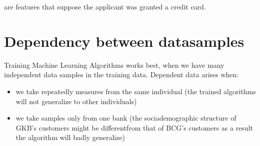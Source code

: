 \documentclass[letterpaper,10pt,english]{jupyterBook}
\begin{document}
\sphinxAtStartPar
are features that suppose the applicant was granted a credit card.


\chapter{Dependency between data\sphinxhyphen{}samples}
\label{\detokenize{dependent_data:dependency-between-data-samples}}
\sphinxAtStartPar
Training Machine Learning Algorithms works best, when we have many independent data samples in the training data. Dependent data arises when:
\begin{itemize}
\item {} 
\sphinxAtStartPar
we take repeatedly measures from the same individual (the trained algorithms will not generalize to other individuals)

\item {} 
\sphinxAtStartPar
we take samples only from one bank (the socia\sphinxhyphen{}demographic structure of GKB’s customers might be differentfrom that of BCG’s customers \sphinxhyphen{} as a result the algorithm will badly generalize)

\end{itemize}
\end{document}
